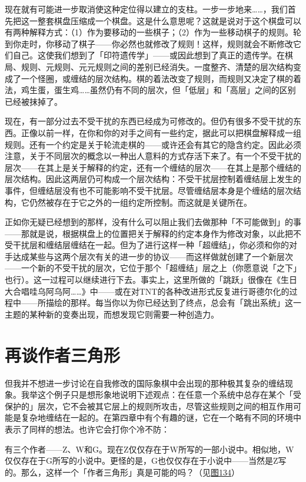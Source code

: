 \documentclass[
  12pt,
  twoside,
  openright,
  oldfontcommands,
]{memoir}
\begin{document}
现在就有可能进一步取消使这种定位得以建立的支柱。一步一步地来\ldots\ldots，我们首先把这一整套棋盘压缩成一个棋盘。这是什么意思呢？这就是说对于这个棋盘可以有两种解释方式：（1）作为要移动的一些棋子；（2）作为一些移动棋子的规则。轮到你走时，你移动了棋子------你必然也就修改了规则！这样，规则就会不断修改它们自己。这使我们想到了「印符遗传学」------或因此想到了真正的遗传学。在棋局、规则、元规则、元元规则之间的差别已经消失。一度整齐、清楚的层次结构变成了一个怪圈，或缠结的层次结构。棋的着法改变了规则，而规则又决定了棋的着法，鸡生蛋，蛋生鸡\ldots\ldots 虽然仍有不同的层次，但「低层」和「高层」之间的区别已经被抹掉了。

现在，有一部分过去不受干扰的东西已经成为可修改的。但仍有很多不受干扰的东西。正像以前一样，在你和你的对手之间有一些约定，据此可以把棋盘解释成一组规则。还有一个约定是关于轮流走棋的------或许还会有其它的隐含约定。因此必须注意，关于不同层次的概念以一种出人意料的方式存活下来了。有一个不受干扰的层次------在其上是关于解释的约定，还有一个缠结的层次------在其上是那个缠结的层次结构。因此这两层仍可构成一个层次结构：不受干扰层控制着缠结层上发生的事件，但缠结层没有也不可能影响不受干扰层。尽管缠结层本身是个缠结的层次结构，它仍然被存在于它之外的一组约定所控制。而这就是关键所在。

正如你无疑已经想到的那样，没有什么可以阻止我们去做那种「不可能做到」的事------那就是说，根据棋盘上的位置把关于解释的约定本身作为修改对象，以此把不受干扰层和缠结层缠结在一起。但为了进行这样一种「超缠结」，你必须和你的对手达成某些与这两个层次有关的进一步的协议------而这样做就创建了一个新层次------一个新的不受干扰的层次，它位于那个「超缠结」层之上（你愿意说「之下」也行）。这一过程可以继续进行下去。事实上，这里所做的「跳跃」很像在《生日大合唱哇乌阿乌阿\ldots\ldots》中------或在对TNT的各种改进形式反复进行哥德尔化的过程中------所描绘的那样。每当你以为你已经达到了终点，总会有「跳出系统」这一主题的某种新的变奏出现，而想发现它则需要一种创造力。

\section{再谈作者三角形}

但我并不想进一步讨论在自我修改的国际象棋中会出现的那种极其复杂的缠结现象。我举这个例子只是想形象地说明下述观点：在任意一个系统中总存在某个「受保护的」层次，它不会被其它层上的规则所攻击，尽管这些规则之间的相互作用可能是复杂地缠结在一起的。在第四章中有个有趣的谜，它在一个略有不同的环境中表示了同样的想法。也许它会打你个冷不防：

有三个作者------Z、W和G。现在Z仅仅存在于W所写的一部小说中。相似地，W仅仅存在于G所写的小说中。更怪的是，G也仅仅存在于小说中------当然是Z写的。那么，这样一个「作者三角形」真是可能的吗？（见\hyperref[fig:134]{图134}）
\end{document}
